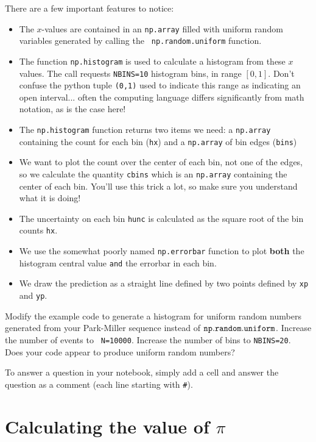 There are a few important features to notice:
\begin{itemize}
 \item The $x$-values are contained in an {\tt np.array} filled with
   uniform random variables generated by calling the {\tt
     np.random.uniform} function.
 \item The function {\tt np.histogram} is used to calculate a histogram
   from these $x$ values.  The call requests {\tt NBINS=10} histogram
   bins, in range $[0,1]$.  Don't confuse the python tuple {\tt (0,1)}
   used to indicate this range as indicating an open interval... often
   the computing language differs significantly from math notation, as
   is the case here!
 \item The {\tt np.histogram} function returns two items we need:  a {\tt np.array} containing the count for each bin ({\tt hx}) and a {\tt np.array} of bin edges ({\tt bins})
 \item We want to plot the count over the center of each bin, not one of the edges, so we calculate the quantity {\tt cbins} which is an {\tt np.array} containing the center of each bin.  You'll use this trick a lot, so make sure you understand what it is doing!
 \item The uncertainty on each bin {\tt hunc} is calculated as the square root of the bin counts {\tt hx}.
 \item We use the somewhat poorly named {\tt np.errorbar} function to plot {\bf both} the histogram central value {\tt and} the errorbar in each bin.
 \item We draw the prediction as a straight line defined by two points defined by {\tt xp} and {\tt yp}.
\end{itemize}

\begin{plot} \end{plot}
Modify the example code to generate a histogram for uniform random
numbers generated from your Park-Miller sequence instead of ${\tt
  np.random.uniform}$.  Increase the number of events to {\tt
  N=10000}.  Increase the number of bins to {\tt NBINS=20}.  Does your
code appear to produce uniform random numbers?

To answer a question in your notebook, simply add a cell and answer the question as a comment (each line starting with {\tt \#}).

\section{Calculating the value of $\pi$}

